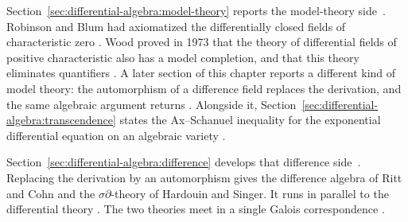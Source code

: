 Section~\ref{sec:differential-algebra:model-theory} reports the model-theory
side~\cite[Theorem~2.2, p.~6]{Aslanyan2018}. Robinson and Blum had axiomatized the differentially closed fields of
characteristic zero \cite[p.~1]{PillayZiegler2003}. Wood proved in 1973 that the theory of differential
fields of positive characteristic also has a model completion, and that this
theory eliminates quantifiers \cite[p.~582]{Wood1973ModelTheory}. A later
section of this chapter reports a different kind of model theory: the
automorphism of a difference field replaces the derivation, and the same
algebraic argument returns \cite[p.~579]{PillayZiegler2003}. Alongside it,
Section~\ref{sec:differential-algebra:transcendence} states the Ax--Schanuel
inequality for the exponential differential equation on an algebraic variety
\cite[Theorem~2.2, p.~6]{Aslanyan2018}.

Section~\ref{sec:differential-algebra:difference} develops that difference
side~\cite[Theorem~2.6, p.~1]{HardouinSinger2008}. Replacing the derivation by an automorphism gives the difference
algebra of Ritt and Cohn and the $\sigma\partial$-theory of Hardouin and
Singer. It runs in parallel to the differential theory
\cite[p.~912]{MikhalevPankratev1989}. The two theories meet in a single
Galois correspondence \cite[Theorem~2.6, p.~1]{HardouinSinger2008}.

